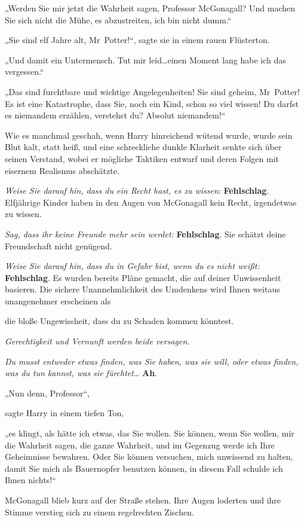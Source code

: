 {„Werden Sie mir jetzt die Wahrheit sagen, Professor McGonagall? Und machen Sie sich nicht die Mühe, es abzustreiten, ich bin nicht dumm.“

„Sie sind elf Jahre alt, Mr~Potter!“, sagte sie in einem rauen Flüsterton.

„Und damit ein Untermensch. Tut mir leid…einen Moment lang habe ich das vergessen.“

„Das sind furchtbare und wichtige Angelegenheiten! Sie sind geheim, Mr~Potter! Es ist eine Katastrophe, dass Sie, noch ein Kind, schon so viel wissen! Du darfst es niemandem erzählen, verstehst du? Absolut niemandem!“

Wie es manchmal geschah, wenn Harry hinreichend wütend wurde, wurde sein Blut kalt, statt heiß, und eine schreckliche dunkle Klarheit senkte sich über seinen Verstand, wobei er mögliche Taktiken entwarf und deren Folgen mit eisernem Realismus abschätzte.

\emph{Weise Sie darauf hin, dass du ein Recht hast, es zu wissen}: \textbf{Fehlschlag}. Elfjährige Kinder haben in den Augen von McGonagall kein Recht, irgendetwas zu wissen.

\emph{Sag, dass ihr keine Freunde mehr sein werdet:} \textbf{Fehlschlag}. Sie schätzt deine Freundschaft nicht genügend.

\emph{Weise Sie darauf hin, dass du in Gefahr bist, wenn du es nicht weißt:} \textbf{Fehlschlag}. Es wurden bereits Pläne gemacht, die auf deiner Unwissenheit basieren. Die sichere Unannehmlichkeit des Umdenkens wird Ihnen weitaus unangenehmer erscheinen als

die bloße Ungewissheit, dass du zu Schaden kommen könntest.

\emph{Gerechtigkeit und Vernunft werden beide versagen.}

\emph{Du musst entweder etwas finden, was Sie haben, was sie will, oder etwas finden, was du tun kannst, was sie fürchtet}… \textbf{Ah}.

„Nun denn, Professor“,

sagte Harry in einem tiefen Ton,

„es klingt, als hätte ich etwas, das Sie wollen. Sie können, wenn Sie wollen, mir die Wahrheit sagen, die ganze Wahrheit, und im Gegenzug werde ich Ihre Geheimnisse bewahren. Oder Sie können versuchen, mich unwissend zu halten, damit Sie mich als Bauernopfer benutzen können, in diesem Fall schulde ich Ihnen nichts!“

McGonagall blieb kurz auf der Straße stehen. Ihre Augen loderten und ihre Stimme verstieg sich zu einem regelrechten Zischen.

}
